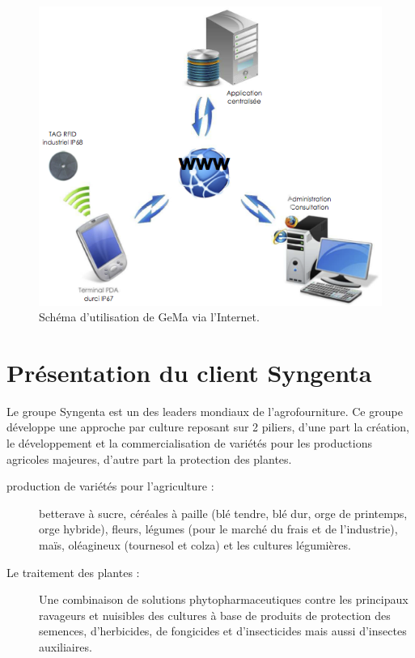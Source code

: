\begin{figure}
  \begin{center}
    \includegraphics{images/gema.png}
    \caption{Schéma d'utilisation de GeMa via l'Internet.}
    \label{gema}
  \end{center}
\end{figure}

\section{Présentation du client Syngenta} %
\label{sec:Présentation du client Syngenta}

Le groupe Syngenta est un des leaders mondiaux de l’agrofourniture.
Ce groupe développe une approche par culture reposant sur 2 piliers,
d'une part la création, le développement et la commercialisation de
variétés pour les productions agricoles majeures, d'autre part la
protection des plantes.

\begin{description}

  \item[production de variétés pour l'agriculture :] betterave à sucre,
    céréales à paille (blé tendre, blé dur, orge de printemps, orge
    hybride), fleurs, légumes (pour le marché du frais et de
    l’industrie), maïs, oléagineux (tournesol et colza) et les cultures
    légumières.

  \item[Le traitement des plantes :] Une combinaison de solutions
    phytopharmaceutiques contre les principaux ravageurs et nuisibles
    des cultures à base de produits de protection des semences,
    d’herbicides, de fongicides et d’insecticides mais aussi d’insectes
    auxiliaires.

\end{description}


